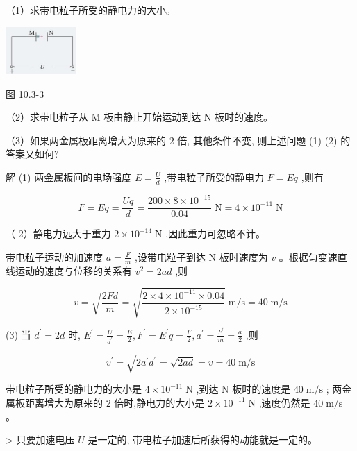 \documentclass[10pt]{article}
\begin{document}
（1）求带电粒子所受的静电力的大小。

\begin{center}
\includegraphics[max width=0.2\textwidth]{images/01911d5f-8e38-70c0-b5b8-2b399bd115b6_41_991520.jpg}
\end{center}

图 10.3-3

（2）求带电粒子从 \(\mathrm{M}\) 板由静止开始运动到达 \(\mathrm{N}\) 板时的速度。

（3）如果两金属板距离增大为原来的 2 倍, 其他条件不变, 则上述问题 (1) (2) 的答案又如何?

解 (1) 两金属板间的电场强度 \(E = \frac{U}{d}\) ,带电粒子所受的静电力 \(F = {Eq}\) ,则有

\[
F = {Eq} = \frac{Uq}{d} = \frac{{200} \times 8 \times {10}^{-{15}}}{0.04}\mathrm{\;N} = 4 \times {10}^{-{11}}\mathrm{\;N}
\]

（ 2）静电力远大于重力 \(2 \times {10}^{-{14}}\mathrm{\;N}\) ,因此重力可忽略不计。

带电粒子运动的加速度 \(a = \frac{F}{m}\) ,设带电粒子到达 \(\mathrm{N}\) 板时速度为 \(v\) 。根据匀变速直线运动的速度与位移的关系有 \({v}^{2} = {2ad}\) ,则

\[
v = \sqrt{\frac{2Fd}{m}} = \sqrt{\frac{2 \times 4 \times {10}^{-{11}} \times {0.04}}{2 \times {10}^{-{15}}}}\mathrm{\;m}/\mathrm{s} = {40}\mathrm{\;m}/\mathrm{s}
\]

(3) 当 \({d}^{\prime } = {2d}\) 时, \({E}^{\prime } = \frac{U}{{d}^{\prime }} = \frac{E}{2},{F}^{\prime } = {E}^{\prime }q = \frac{F}{2},{a}^{\prime } = \frac{{F}^{\prime }}{m} = \frac{a}{2}\) ,则

\[
{v}^{\prime } = \sqrt{2{a}^{\prime }{d}^{\prime }} = \sqrt{2ad} = v = {40}\mathrm{\;m}/\mathrm{s}
\]

带电粒子所受的静电力的大小是 \(4 \times {10}^{-{11}}\mathrm{\;N}\) ,到达 \(\mathrm{N}\) 板时的速度是 \({40}\mathrm{\;m}/\mathrm{s}\) ; 两金属板距离增大为原来的 2 倍时,静电力的大小是 \(2 \times {10}^{-{11}}\mathrm{\;N}\) ,速度仍然是 \({40}\mathrm{\;m}/\mathrm{s}\) 。

\begin{mdframed}

> 只要加速电压 \(U\) 是一定的, 带电粒子加速后所获得的动能就是一定的。

\end{mdframed}
\end{document}
